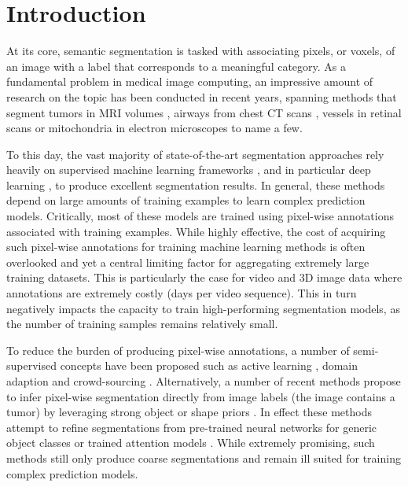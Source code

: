 
\section{Introduction}
\label{sec:intro}

At its core, semantic segmentation is tasked with associating pixels, or voxels, of an image with a label that corresponds to a meaningful category. As a fundamental problem in medical image computing, an impressive amount of research on the topic has been conducted in recent years, spanning methods that segment tumors in MRI volumes \cite{zikic2014,menze15}, airways from chest CT scans \cite{miyawaki17}, vessels in retinal scans \cite{pilch12} or mitochondria in electron microscopes \cite{seyed13} to name a few.

To this day, the vast majority of state-of-the-art segmentation approaches rely heavily on supervised machine learning frameworks \cite{sweeney14,menze15}, and in particular deep learning \cite{garcia17}, to produce excellent segmentation results. In general, these methods depend on large amounts of training examples to learn complex prediction models. Critically, most of these models are trained using pixel-wise annotations associated with training examples. While highly effective, the cost of acquiring such pixel-wise annotations for training machine learning methods is often overlooked and yet a central limiting factor for aggregating extremely large training datasets. This is particularly the case for video and 3D image data where annotations are extremely costly (\ie days per video sequence). This in turn negatively impacts the capacity to train high-performing segmentation models, as the number of training samples remains relatively small.

To reduce the burden of producing pixel-wise annotations, a number of semi-supervised concepts have been proposed such as active learning \cite{KonSznFua15}, domain adaption \cite{tzeng17} and crowd-sourcing \cite{mavandadi12}. Alternatively, a number of recent methods propose to infer pixel-wise segmentation directly from image labels (\ie the image contains a tumor) by leveraging strong object or shape priors \cite{menze10}. In effect these methods attempt to refine segmentations from pre-trained neural networks for generic object classes \cite{su15} or trained attention models \cite{kingma14}. While extremely promising, such methods still only produce coarse segmentations and remain ill suited for training complex prediction models.

